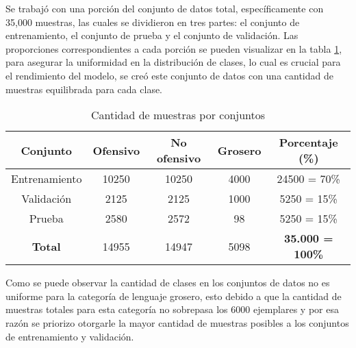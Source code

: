Se trabajó con una porción del conjunto de datos total, específicamente con 35,000 muestras, las cuales se dividieron en tres partes: el conjunto de entrenamiento, el conjunto de prueba y el conjunto de validación. Las proporciones correspondientes a cada porción se pueden visualizar en la tabla \ref{tbl:conjuntos}, para asegurar la uniformidad en la distribución de clases, lo cual es crucial para el rendimiento del modelo, se creó este conjunto de datos con una cantidad de muestras equilibrada para cada clase.


\begin{table}[!ht]
	\centering
	\begin{tabular}{|c|c|c|c|c|}
		\hline
		\textbf{Conjunto} & \textbf{Ofensivo} & \textbf{No ofensivo} & \textbf{Grosero} & \textbf{Porcentaje (\%)} \\ \hline
		Entrenamiento & 10250 & 10250 & 4000 & 24500 = 70\% \\ 
		Validación & 2125 & 2125 & 1000 & 5250 = 15\% \\ 
		Prueba & 2580 & 2572 & 98 & 5250 = 15\% \\ \hline
		\textbf{Total} & 14955 & 14947 & 5098 & \textbf{35.000 = 100\%} \\ \hline
	\end{tabular}
	\caption{Cantidad de muestras por conjuntos}
	\label{tbl:conjuntos}
\end{table}


Como se puede observar la cantidad de clases en los conjuntos de datos no es uniforme para la categoría de lenguaje grosero, esto debido a que la cantidad de muestras totales para esta categoría no sobrepasa los 6000 ejemplares y por esa razón se priorizo otorgarle la mayor cantidad de muestras posibles a los conjuntos de entrenamiento y validación.